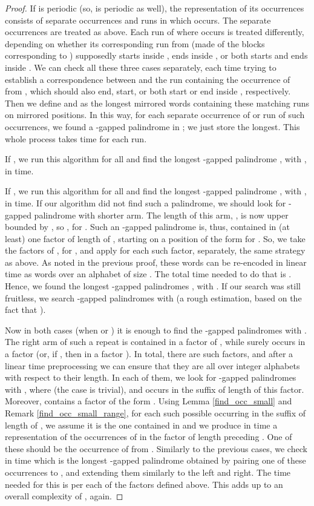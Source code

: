 \documentclass[final]{dmtcs-episciences}
\begin{document}
\begin{proof}
If  is periodic (so,  is periodic as well), the representation of its occurrences consists of  separate occurrences and  runs in which  occurs. The separate occurrences are treated as above. Each run  of  where  occurs is treated differently, depending on whether its corresponding run  from  (made of the blocks corresponding to ) supposedly starts inside , ends inside , or both starts and ends inside . We can check all these three cases separately, each time trying to establish a correspondence between  and the run containing the occurrence of  from , which should also end, start, or both start or end inside , respectively. Then we define  and  as the longest mirrored words containing these matching runs on mirrored positions. In this way, for each separate occurrence of  or run of such occurrences, we found a -gapped palindrome in ; we just store the longest. This whole process takes  time for each run.

If , we run this algorithm for all  and find the longest -gapped palindrome , with , in  time. 

If , we run this algorithm for all  and find the longest -gapped palindrome , with , in  time. If our algorithm did not find such a palindrome, we should look for -gapped palindrome with shorter arm. The length of this arm, , is now upper bounded by , so , for . Such an -gapped palindrome  is, thus, contained in (at least) one factor of length  of , starting on a position of the form  for .  So, we take the factors  of , for , and apply for each such factor, separately, the same strategy as above. As noted in the previous proof, these words can be re-encoded in linear time as words over an alphabet of size . The total time needed to do that is . Hence, we found the longest -gapped palindromes , with . If our search was still fruitless, we search -gapped palindromes with  (a rough estimation, based on the fact that ). 

Now in both cases (when  or ) it is enough to find the -gapped palindromes with . The right arm  of such a repeat is contained in a factor  of , while  surely occurs in a factor  (or, if , then in a factor ). In total, there are  such  factors, and after a linear time preprocessing we can ensure that they are all over integer alphabets with respect to their length. In each of them, we look for -gapped palindromes  with , where  (the case  is trivial), and  occurs in the suffix of length  of this factor. Moreover,  contains a factor  of the form . Using Lemma \ref{find_occ_small} and Remark \ref{find_occ_small_range}, 
for each such possible  occurring in the suffix of length  of , we assume it is the one contained in  and we produce in  time a representation of the  occurrences of  in the factor of length  preceding . One of these should be the occurrence of  from . Similarly to the previous cases, we check in  time which is the longest -gapped palindrome obtained by pairing one of these occurrences to , and extending them similarly to the left and right. The time needed for this is  per each of the  factors  defined above. 
This adds up to an overall complexity of , again.


\end{proof}
\end{document}
